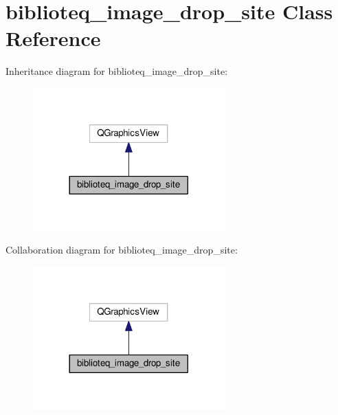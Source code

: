 \hypertarget{classbiblioteq__image__drop__site}{}\section{biblioteq\+\_\+image\+\_\+drop\+\_\+site Class Reference}
\label{classbiblioteq__image__drop__site}


Inheritance diagram for biblioteq\+\_\+image\+\_\+drop\+\_\+site\+:
\nopagebreak
\begin{figure}[H]
\begin{center}
\leavevmode
\includegraphics[width=209pt]{classbiblioteq__image__drop__site__inherit__graph}
\end{center}
\end{figure}


Collaboration diagram for biblioteq\+\_\+image\+\_\+drop\+\_\+site\+:
\nopagebreak
\begin{figure}[H]
\begin{center}
\leavevmode
\includegraphics[width=209pt]{classbiblioteq__image__drop__site__coll__graph}
\end{center}
\end{figure}
